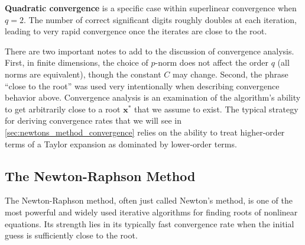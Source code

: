 \textbf{Quadratic convergence} is a specific case within superlinear convergence when $q=2$. The number of correct significant digits roughly doubles at each iteration, leading to very rapid convergence once the iterates are close to the root.

There are two important notes to add to the discussion of convergence analysis. First, in finite dimensions, the choice of $p$-norm does not affect the order $q$ (all norms are equivalent), though the constant $C$ may change. Second, the phrase ``close to the root'' was used very intentionally when describing convergence behavior above. Convergence analysis is an examination of the algorithm's ability to get arbitrarily close to a root $\mathbf x^*$ that we assume to exist. The typical strategy for deriving convergence rates that we will see in \autoref{sec:newtons_method_convergence} relies on the ability to treat higher-order terms of a Taylor expansion as dominated by lower-order terms. 



\subsection{The Newton-Raphson Method}
The Newton-Raphson method, often just called Newton's method, is one of the most powerful and widely used iterative algorithms for finding roots of nonlinear equations. Its strength lies in its typically fast convergence rate when the initial guess is sufficiently close to the root.

